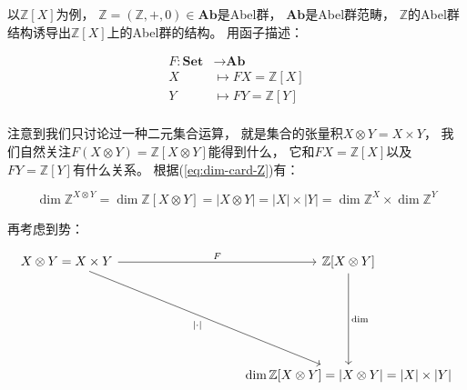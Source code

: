 \documentclass[10pt, openany]{book}
\begin{document}
以$\mathbb Z[X]$为例，
$\mathbb Z = (\mathbb Z,+,0)\in\textbf{Ab}$是Abel群，
$\textbf{Ab}$是Abel群范畴，
$\mathbb Z$的Abel群结构诱导出$\mathbb Z[X]$上的Abel群的结构。
用函子描述：

$$
\begin{aligned}
F: \textbf{Set} &\to \textbf{Ab} \\
X &\mapsto FX = \mathbb Z[X] \\
Y &\mapsto FY = \mathbb Z[Y] \\
\end{aligned}
$$

注意到我们只讨论过一种二元集合运算，
就是集合的张量积$X \otimes Y = X \times Y$，
我们自然关注$F(X \otimes Y) = \mathbb Z[X \otimes Y]$能得到什么，
它和$FX = \mathbb Z[X]$以及$FY = \mathbb Z[Y]$有什么关系。
根据(\ref{eq:dim-card-Z})有：

\begin{equation}
\dim \mathbb Z^{X \otimes Y} = \dim \mathbb Z[X \otimes Y] = |X \otimes Y| = |X| \times |Y|
= \dim \mathbb Z^X \times \dim \mathbb Z^Y
\end{equation}\label{eq:dim-card}

再考虑到势：

$$
\begin{tikzcd}
X \otimes Y = X \times Y \arrow[rrrr, "F"] \arrow[rrrrdddd, "|\cdot|"'] &  &  &  & {\mathbb Z[X \otimes Y]} \arrow[dddd, "\dim"]                  \\
                                                                        &  &  &  &                                                                \\
                                                                        &  &  &  &                                                                \\
                                                                        &  &  &  &                                                                \\
                                                                        &  &  &  & {\dim \mathbb Z[X \otimes Y] = |X \otimes Y| = |X| \times |Y|}
\end{tikzcd}
$$
\end{document}
